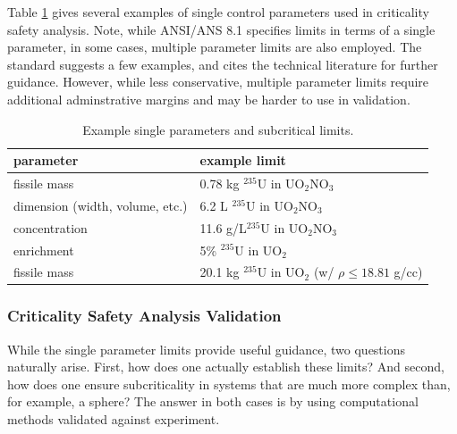 Table \ref{tbl:controlparams} gives several examples of single control 
parameters used in criticality safety analysis.  Note, while ANSI/ANS 8.1 
specifies limits in terms of a single parameter, in some cases, multiple 
parameter limits are also employed.  The standard suggests a few examples, and
cites the technical literature for further guidance. However, while less 
conservative, multiple 
parameter limits require additional adminstrative margins and may be harder to 
use in validation.

\begin{table}[ht]
    \caption{Example single parameters and subcritical limits.}
    \begin{center} 
    \begin{tabular*}{0.90\textwidth}{@{\extracolsep{\fill}} ll } 
      \toprule 
	parameter &  example limit \\
      \midrule
       fissile mass                    &  0.78 kg ${}^{235}$U in UO$_2$NO$_3$ \\
       dimension (width, volume, etc.) &  6.2   L ${}^{235}$U in UO$_2$NO$_3$ \\
       concentration                   &  11.6 g/L${}^{235}$U in UO$_2$NO$_3$ \\
       enrichment                      &  5\%     ${}^{235}$U in UO$_2$       \\
       fissile mass                    &  20.1 kg ${}^{235}$U in UO$_2$ 
                                          (w/ $\rho \leq 18.81$ g/cc) \\
      \bottomrule 
    \end{tabular*} 
    \end{center} 
    \label{tbl:controlparams}
\end{table}



\subsubsection*{Criticality Safety Analysis Validation}

While the single parameter limits provide useful guidance, two questions 
naturally arise.  First, how does one actually establish these limits?  And 
second, how does one ensure subcriticality in systems that are much more 
complex than, for example, a sphere?  The answer in both cases is by using 
computational methods validated against experiment.

